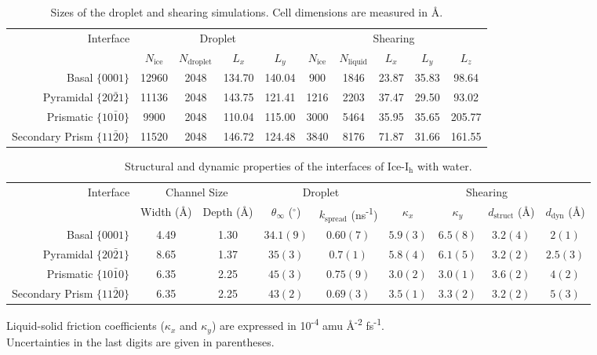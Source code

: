 \begin{table}[h]
\centering
\caption{Sizes of the droplet and shearing simulations.  Cell
  dimensions are measured in \AA. \label{tab:method}}
\begin{tabular}{r|cccc|ccccc} 
\toprule
 \multirow{2}{*}{Interface} & \multicolumn{4}{c|}{Droplet} & \multicolumn{5}{c}{
Shearing} \\
  & $N_\mathrm{ice}$ & $N_\mathrm{droplet}$ & $L_x$ & $L_y$ & $N_\mathrm{ice}$ &
 $N_\mathrm{liquid}$ & $L_x$ & $L_y$ & $L_z$  \\ 
\toprule
Basal  $\{0001\}$                    & 12960 & 2048 & 134.70 & 140.04 & 900 & 1846  & 23.87 & 35.83 & 98.64  \\
Pyramidal  $\{20\bar{2}1\}$       & 11136 & 2048 & 143.75 & 121.41 & 1216 & 2203 & 37.47 & 29.50 & 93.02  \\
Prismatic  $\{10\bar{1}0\}$       &  9900 & 2048 & 110.04 & 115.00 & 3000 & 5464 & 35.95 & 35.65 & 205.77 \\
Secondary Prism  $\{11\bar{2}0\}$ & 11520 & 2048 & 146.72 & 124.48 & 3840 & 8176 & 71.87 & 31.66 & 161.55 \\
\bottomrule
\end{tabular}
\end{table}


\begin{table}[h]
\centering
\caption{Structural and dynamic properties of the interfaces of
  Ice-I$_\mathrm{h}$ with water.\label{tab:kappa}}
\begin{tabular}{r|cc|cc|cccc}  
\toprule
\multirow{2}{*}{Interface} & \multicolumn{2}{c|}{Channel Size} &\multicolumn{2}{c|}{Droplet} & \multicolumn{4}{c}{Shearing\footnotemark[1]}\\
  & Width (\AA) & Depth (\AA) & $\theta_{\infty}$ ($^\circ$)  & $k_\mathrm{spread}$  (ns\textsuperscript{-1}) &
$\kappa_{x}$  & $\kappa_{y}$ & $d_\mathrm{struct}$ (\AA) &  $d_\mathrm{dyn}$ (\AA) \\ 
\toprule
Basal  $\{0001\}$                    & 4.49 & 1.30 & $34.1(9)$ &$0.60(7)$
& $5.9(3)$ & $6.5(8)$ & $3.2(4)$ & $2(1)$  \\
Pyramidal  $\{20\bar{2}1\}$       & 8.65 & 1.37 & $35(3)$ &  $0.7(1)$ &
$5.8(4)$ & $6.1(5)$ & $3.2(2)$ & $2.5(3)$\\
Prismatic  $\{10\bar{1}0\}$       & 6.35 & 2.25 & $45(3)$ & $0.75(9)$ &
$3.0(2)$ & $3.0(1)$ & $3.6(2)$ & $4(2)$ \\
Secondary Prism  $\{11\bar{2}0\}$ & 6.35 & 2.25 & $43(2)$ & $0.69(3)$ &
$3.5(1)$ & $3.3(2)$ & $3.2(2)$ & $5(3)$ \\ 
\bottomrule
\end{tabular}
\begin{flushleft}
\footnotemark[1]\footnotesize{Liquid-solid friction coefficients ($\kappa_x$ and
  $\kappa_y$) are expressed in 10\textsuperscript{-4} amu
  \AA\textsuperscript{-2} fs\textsuperscript{-1}.} \\
\footnotemark[2]\footnotesize{Uncertainties in
  the last digits are given in parentheses.} 
\end{flushleft}
\end{table}

